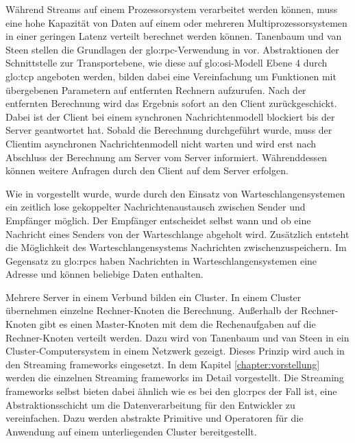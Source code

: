 
Während Streams auf einem Prozessorsystem verarbeitet werden können, muss eine hohe Kapazität von Daten auf einem oder mehreren Multiprozessorsystemen in einer geringen Latenz verteilt berechnet werden können. Tanenbaum und van Steen stellen die Grundlagen der \gls{glo:rpc}-Verwendung in  vor. Abstraktionen der Schnittstelle zur Transportebene, wie diese auf \acrshort{glo:osi}-Modell Ebene 4 durch \gls{glo:tcp} angeboten werden, bilden dabei eine Vereinfachung um Funktionen mit übergebenen Parametern auf entfernten Rechnern aufzurufen. Nach der entfernten Berechnung wird das Ergebnis sofort an den Client zurückgeschickt. Dabei ist der Client bei einem synchronen Nachrichtenmodell blockiert bis der Server geantwortet hat. Sobald die Berechnung durchgeführt wurde, muss der Clientim asynchronen Nachrichtenmodell nicht warten und wird erst nach Abschluss der Berechnung am Server vom Server informiert. Währenddessen können weitere Anfragen durch den Client auf dem Server erfolgen. 

Wie in  vorgestellt wurde, wurde durch den Einsatz von Warteschlangensystemen ein zeitlich lose gekoppelter Nachrichtenaustausch zwischen Sender und Empfänger möglich. Der Empfänger entscheidet selbst wann und ob eine Nachricht eines Senders von der Warteschlange abgeholt wird. Zusätzlich entsteht die Möglichkeit des Warteschlangensystems Nachrichten zwischenzuspeichern. Im Gegensatz zu \glspl{glo:rpc} haben Nachrichten in Warteschlangensystemen eine Adresse und können beliebige Daten enthalten. 

Mehrere Server in einem Verbund bilden ein Cluster. In einem Cluster übernehmen einzelne Rechner-Knoten die Berechnung. Außerhalb der Rechner-Knoten gibt es einen Master-Knoten mit dem die Rechenaufgaben auf die Rechner-Knoten verteilt werden. Dazu wird von Tanenbaum und van Steen in  ein Cluster-Computersystem in einem Netzwerk gezeigt. Dieses Prinzip wird auch in den Streaming frameworks eingesetzt. In dem Kapitel \ref{chapter:vorstellung} werden die einzelnen Streaming frameworks im Detail vorgestellt. Die Streaming frameworks selbst bieten dabei ähnlich wie es bei den \glspl{glo:rpc} der Fall ist, eine Abstraktionsschicht um die Datenverarbeitung für den Entwickler zu vereinfachen. Dazu werden abstrakte Primitive und Operatoren für die Anwendung auf einem unterliegenden Cluster bereitgestellt.

